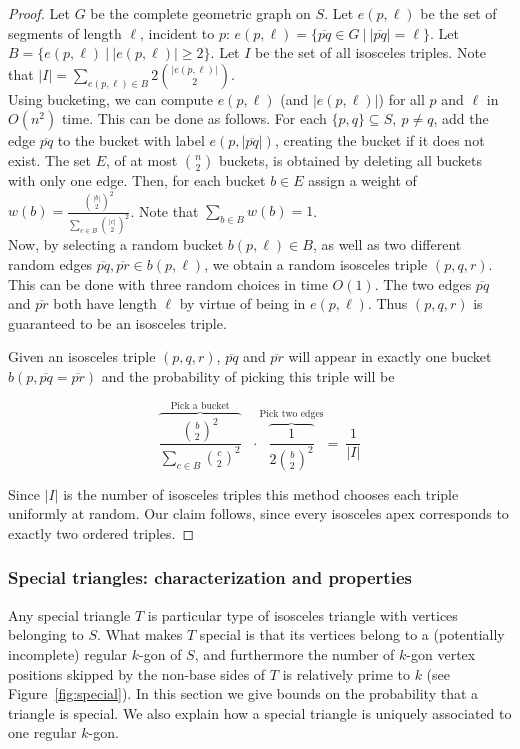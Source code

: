 \documentclass{article}
\begin{document}
\begin{proof}
Let $G$ be the complete geometric graph on $S$.
Let $e(p,\ell)$ be the set of segments of length $\ell$, incident to  
$p$:  $e(p,\ell)=\{ \overline{pq}{\in}G~|~|\overline{pq}|{=}\ell \}$.
 Let $B = \{ e(p,\ell)~|~|e(p,\ell)|{\geq}2 \}$. Let $I$ be the set of all isosceles triples.
Note that $|I|=\sum_{e(p,\ell) \in B} 2\binom{|e(p,\ell)|}{2}$.\\

Using bucketing, we can compute $e(p,\ell)$ (and $|e(p,\ell)|$) for all $p$
and $\ell$ in $O(n^2)$ time.
This can be done as follows. For each $\{p,q\}{\subseteq}S,~p{\not=}q$,
add the edge $\overline{pq}$ to the bucket with label
$e(p,|\overline{pq}|)$, creating the bucket if it does not exist.
The set $E$, of at most ${n \choose 2}$ buckets, is obtained by deleting all buckets with only one edge. Then, for each bucket $b \in E$ assign a
weight of $w(b)=\frac{{|b| \choose 2}^2}{\sum_{c \in B} {|c| \choose
2}^2}$. Note that $\sum_{b \in B} w(b)=1$. \\

Now, by selecting a random bucket $b(p,\ell)\in B$, as well as two
different random edges $\overline{pq}, \overline{pr} \in b(p,\ell)$, we obtain a random
 isosceles triple $(p,q,r)$. This can be done with three
random choices in time $O(1)$. The two edges $\overline{pq}$ and
$\overline{pr}$ both have length $\ell$ by virtue of being in
$e(p,\ell)$. Thus $(p,q,r)$ is guaranteed to be an isosceles triple.

Given an isosceles triple $(p,q,r)$, $\overline{pq}$ and
$\overline{pr}$ will appear in exactly one bucket $b(p,\overline{pq}=
\overline{pr})$ and the probability of picking this triple will be

$$\overbrace{\frac{{b \choose 2}^2}{\sum_{c \in B} {c \choose
2}^2}}^{\text{Pick a bucket}} 
~~~\cdot 
\overbrace{\frac{1}{ 2{b \choose
2}^2 }}^{\text{Pick two edges}} = 
~\frac{1}{|I|}$$

 \noindent Since  $|I|$ is the
number of isosceles triples this method chooses each triple
uniformly at random.  Our claim follows, since every isosceles apex corresponds to exactly
two ordered triples.
\end{proof}




\subsubsection{Special triangles:  characterization and properties}
\label{special}
Any special triangle $T$ is particular type of isosceles triangle with vertices belonging to $S$.
What makes $T$ special is that its vertices belong to a (potentially incomplete) regular $k$-gon of $S$, and furthermore
the number of $k$-gon vertex positions skipped by the non-base sides of $T$ is relatively prime to $k$ (see
Figure~\ref{fig:special}).
In this section we give bounds on the probability that a triangle is special. We also
explain how a special triangle is uniquely associated to one regular $k$-gon.
\end{document}
